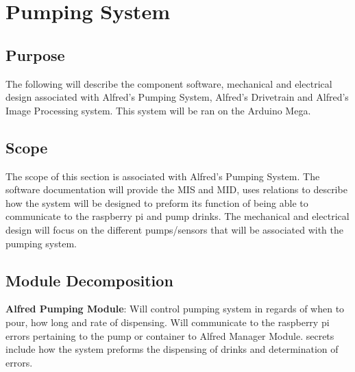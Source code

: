\documentclass [10pt]{article}
\begin{document}


\section {Pumping System}



\subsection{Purpose}
The following will describe the component software, mechanical and electrical design associated with Alfred's Pumping System, Alfred's Drivetrain and Alfred's Image Processing system. This system will be ran on the Arduino Mega.


\subsection{Scope}
The scope of this section is associated with Alfred's Pumping System. The software documentation will provide the MIS and MID, uses relations to describe how the system will be designed to preform its function of being able to communicate to the raspberry pi and pump drinks. The mechanical and electrical design will focus on the different pumps/sensors that will be associated with the pumping system.


\subsection{Module Decomposition}

\textbf{Alfred Pumping Module}: Will control pumping system in regards of when to pour, how long and rate of dispensing. Will communicate to the raspberry pi errors pertaining to the pump or container to Alfred Manager Module. secrets include how the system preforms the dispensing of drinks and determination of errors.

\end{document}
